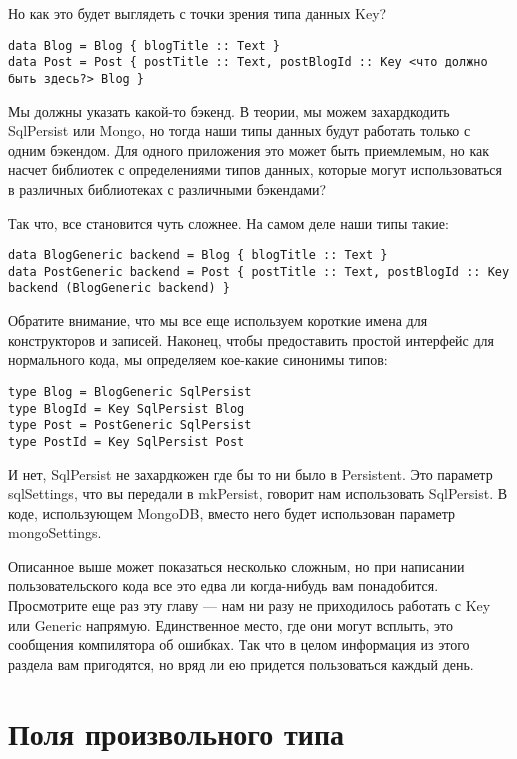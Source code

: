 Но как это будет выглядеть с точки зрения типа данных Key?

\begin{lstlisting}
data Blog = Blog { blogTitle :: Text }
data Post = Post { postTitle :: Text, postBlogId :: Key <что должно быть здесь?> Blog }
\end{lstlisting}

Мы должны указать какой-то бэкенд. В теории, мы можем захардкодить SqlPersist или Mongo, но тогда наши типы данных будут работать только с одним бэкендом. Для одного приложения это может быть приемлемым, но как насчет библиотек с определениями типов данных, которые могут использоваться в различных библиотеках с различными бэкендами?

Так что, все становится чуть сложнее. На самом деле наши типы такие:

\begin{lstlisting}
data BlogGeneric backend = Blog { blogTitle :: Text }
data PostGeneric backend = Post { postTitle :: Text, postBlogId :: Key backend (BlogGeneric backend) }
\end{lstlisting}

Обратите внимание, что мы все еще используем короткие имена для конструкторов и записей. Наконец, чтобы предоставить простой интерфейс для нормального кода, мы определяем кое-какие синонимы типов:

\begin{lstlisting}
type Blog = BlogGeneric SqlPersist
type BlogId = Key SqlPersist Blog
type Post = PostGeneric SqlPersist
type PostId = Key SqlPersist Post
\end{lstlisting}

И нет, SqlPersist не захардкожен где бы то ни было в Persistent. Это параметр sqlSettings, что вы передали в mkPersist, говорит нам использовать SqlPersist. В коде, использующем MongoDB, вместо него будет использован параметр mongoSettings.

Описанное выше может показаться несколько сложным, но при написании пользовательского кода все это едва ли когда-нибудь вам понадобится. Просмотрите еще раз эту главу --- нам ни разу не приходилось работать с Key или Generic напрямую. Единственное место, где они могут всплыть, это сообщения компилятора об ошибках. Так что в целом информация из этого раздела вам пригодятся, но вряд ли ею придется пользоваться каждый день.

\section{Поля произвольного типа} %

